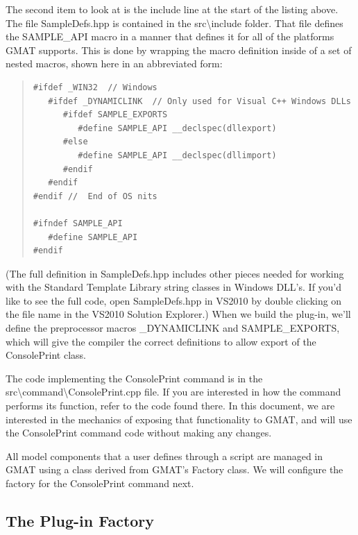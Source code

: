 \documentclass[10pt,letterpaper]{article}
\begin{document}
The second item to look at is the include line at the start of the listing above.  The file SampleDefs.hpp is contained in the src{\textbackslash}include folder.  That file defines the SAMPLE{\_}API macro in a manner that defines it for all of the platforms GMAT supports.  This is done by wrapping the macro definition inside of a set of nested macros, shown here in an abbreviated form:

\begin{quote}
\begin{verbatim}
#ifdef _WIN32  // Windows
   #ifdef _DYNAMICLINK  // Only used for Visual C++ Windows DLLs
      #ifdef SAMPLE_EXPORTS
         #define SAMPLE_API __declspec(dllexport)
      #else
         #define SAMPLE_API __declspec(dllimport)
      #endif
   #endif
#endif //  End of OS nits

#ifndef SAMPLE_API
   #define SAMPLE_API
#endif
\end{verbatim}
\end{quote}

\noindent (The full definition in SampleDefs.hpp includes other pieces needed for working with the Standard Template Library string classes in Windows DLL's.  If you'd like to see the full code, open SampleDefs.hpp in VS2010 by double clicking on the file name in the VS2010 Solution Explorer.)  When we build the plug-in, we'll define the preprocessor macros {\_}DYNAMICLINK and SAMPLE{\_}EXPORTS, which will give the compiler the correct definitions to allow export of the ConsolePrint class.

The code implementing the ConsolePrint command is in the src{\textbackslash}command{\textbackslash}ConsolePrint.cpp file.  If you are interested in how the command performs its function, refer to the code found there.  In this document, we are interested in the mechanics of exposing that functionality to GMAT, and will use the ConsolePrint command code without making any changes.  

All model components that a user defines through a script are managed in GMAT using a class derived from GMAT's Factory class.  We will configure the factory for the ConsolePrint command next.  

\subsection{The Plug-in Factory}
\end{document}
